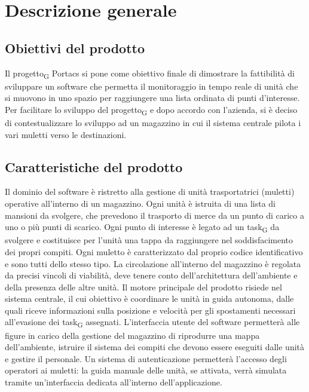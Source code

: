 \section{Descrizione generale}

\subsection{Obiettivi del prodotto}
Il \gls{progetto}\textsubscript{G} Portacs si pone come obiettivo finale di dimostrare la fattibilità di sviluppare un software che permetta il monitoraggio in tempo reale di unità che si muovono in uno spazio per raggiungere una lista ordinata di punti d’interesse. Per facilitare lo sviluppo del \gls{progetto}\textsubscript{G} e dopo accordo con l'azienda, si è deciso di contestualizzare lo sviluppo ad un magazzino in cui il sistema centrale pilota i vari muletti verso le destinazioni.

\subsection{Caratteristiche del prodotto}
Il dominio del software è ristretto alla gestione di unità trasportatrici (muletti) operative all’interno di un magazzino. Ogni unità è istruita di una lista di mansioni da svolgere, che prevedono il trasporto di merce da un punto di carico a uno o più punti di scarico. Ogni punto di interesse è legato ad un \gls{task}\textsubscript{G} da svolgere e costituisce per l’unità una tappa da raggiungere nel soddisfacimento dei propri compiti. Ogni muletto è caratterizzato dal proprio codice identificativo e sono tutti dello stesso tipo.
La circolazione all’interno del magazzino è regolata da precisi vincoli di viabilità, deve tenere conto dell’architettura dell’ambiente e della presenza delle altre unità. 
Il motore principale del prodotto risiede nel sistema centrale, il cui obiettivo è coordinare le unità in guida autonoma, dalle quali riceve informazioni sulla posizione e velocità per gli spostamenti necessari all’evasione dei \gls{task}\textsubscript{G} assegnati. L’interfaccia utente del software permetterà alle figure in carico della gestione del magazzino di riprodurre una mappa dell’ambiente, istruire il sistema dei compiti che devono essere eseguiti dalle unità e gestire il personale. Un sistema di autenticazione permetterà l’accesso degli operatori ai muletti: la guida manuale delle unità, se attivata, verrà simulata tramite un’interfaccia dedicata all’interno dell’applicazione.

